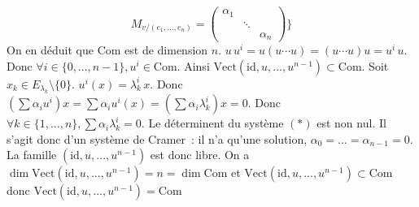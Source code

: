 {\begin{enumerate}
{$$    M_{v/(e_{1},...,e_{n})}=
      \begin{pmatrix}
        \alpha_{1}& & \\ &\ddots& \\ & & \alpha_{n}
      \end{pmatrix}
      \}$$
    On en déduit que $\mathrm{Com}$ est de dimension $n$.
$u\,u^{i}=u(u\cdots u)=(u\cdots u)u=u^{i}\, u$. Donc $\forall
    i\in\{0,...,n-1\}, u^{i}\in\mathrm{Com}$. Ainsi
    $\mathrm{Vect}(\mathrm{id},u,...,u^{n-1})\subset\mathrm{Com}$.
Soit $x_{k}\in E_{\lambda_{k}}\setminus\{0\}$.
    $u^{i}(x)=\lambda_{k}^{i}\,x$. Donc $(\sum \alpha_{i}u^{i})x
    =\sum\alpha_{i}u^{i}(x) =(\sum\alpha_{i}\lambda_{k}^{i})x=0$. Donc
    $\forall k\in\{1,...,n\}, \sum\alpha_{i}\lambda_{k}^{i}=0$.
Le déterminent du système $(*)$ est non nul. Il s'agit donc d'un
    système de Cramer~: il n'a qu'une solution,
    $\alpha_{0}=...=\alpha_{n-1}=0$. La famille $(\mathrm{id}, u, ..., u^{n-1})$
    est donc libre.
On a $\dim\mathrm{Vect}(\mathrm{id}, u, ..., u^{n-1})=n=\dim\mathrm{Com}$ et $\mathrm{Vect}(\mathrm{id}, u,
    ..., u^{n-1})\subset\mathrm{Com}$ donc $\mathrm{Vect}(\mathrm{id}, u, ..., u^{n-1})=\mathrm{Com}$
}
\end{enumerate}
}
